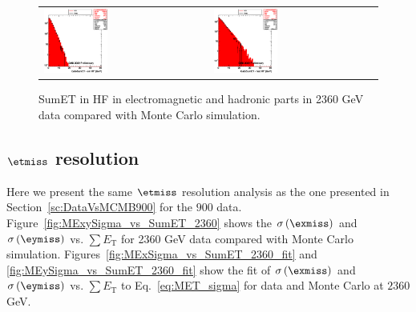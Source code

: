 \begin{figure}[h!]
 \centering
 \begin{tabular}{ll}
  \includegraphics[width=0.40\textwidth]{plots_DataVsMC_MB_2360GeV/h_caloSumetEmHF.eps} &
  \includegraphics[width=0.40\textwidth]{plots_DataVsMC_MB_2360GeV/h_caloSumetHadHF.eps} \\
 \end{tabular}
 \caption{SumET in HF in electromagnetic and hadronic parts in 2360 GeV data compared
   with Monte Carlo simulation.
          \label{fig:DataVsMC_MB_2360_6}}
\end{figure}

\clearpage

\subsection{$\etmiss$ resolution}

Here we present the same $\etmiss$ resolution analysis as the one presented in Section~\ref{sc:DataVsMCMB900} for the $900$ data. 
Figure~\ref{fig:MExySigma_vs_SumET_2360} shows the $\sigma\left(\exmiss\right)$ and $\sigma\left(\eymiss\right)$ 
vs. $\sum E_\text{T}$ for 2360 GeV data compared with Monte Carlo simulation. Figures~\ref{fig:MExSigma_vs_SumET_2360_fit} 
and \ref{fig:MEySigma_vs_SumET_2360_fit} show the fit of $\sigma\left(\exmiss\right)$ and $\sigma\left(\eymiss\right)$ vs. 
$\sum E_\text{T}$ to Eq.~\ref{eq:MET_sigma} for data and  Monte Carlo at $2360$ GeV.

